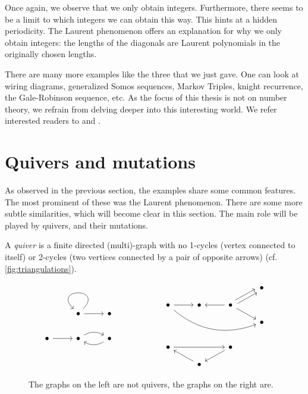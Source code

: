 %
Once again, we observe that we only obtain integers. Furthermore, there seems to be a
limit to which integers we can obtain this way. This hints at a hidden periodicity. The
Laurent phenomenon offers an explanation for why we only obtain integers: the lengths
of the diagonals are Laurent polynomials in the originally chosen lengths.

There are many more examples like the three that we just gave. One can look at wiring
diagrams, generalized Somos sequences, Markov Triples, knight recurrence, the
Gale-Robinson sequence, etc. As the focus of this thesis is not on number theory, we
refrain from delving deeper into this interesting world. We refer interested readers to
\cite[Chapter 3.4]{FominWilliams2021IntroductionCA_1-3} and
\cite{FominZelevinsky2002Laurent}.

\section{Quivers and mutations}

As observed in the previous section, the examples share some common features. The most
prominent of these was the Laurent phenomenon. There are some more subtle similarities,
which will become clear in this section. The main role will be played by quivers, and
their mutations.

\begin{definition}[Quivers]
	A \emph{quiver} is a finite directed (multi)-graph with no 1-cycles (vertex connected to itself) or 2-cycles (two vertices connected by a pair of opposite arrows) (cf. \cref{fig:triangulations}).
\end{definition}

\begin{figure}
	\centering
	\begin{equation*}
		\begin{tikzcd}
			&\bullet \arrow[loop] \arrow[r] &\bullet \\
			\bullet \rar & \bullet \arrow[r, bend left] & \bullet \arrow[l, bend left]
		\end{tikzcd}
		\hspace{2cm}
		\begin{tikzcd}[row sep=small]
			&&& \bullet \\
			\bullet \ar[rrrd, bend right]\rar &\bullet  \rar[leftarrow] &\bullet \ar[ru, shift left] \ar[ru, shift right] \ar[rd] \\
			&&& \bullet\\
			\\
			\bullet \ar[rr] && \bullet \ar[ld]\\
			& \bullet \ar[lu]
		\end{tikzcd}
	\end{equation*}
	\caption{The graphs on the left are not quivers, the graphs on the right are.}
	\label{fig:quivers}
\end{figure}

